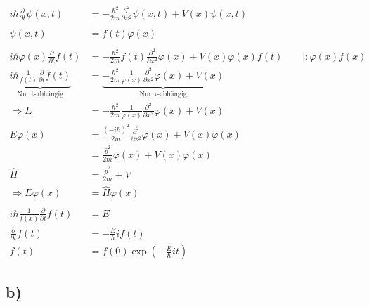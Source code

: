     \begin{align*}
        i\hbar \frac{\partial}{\partial t} \psi(x, t) &= -\frac{\hbar^2}{2m} \frac{\partial^2}{\partial x^2} \psi(x, t) + V(x) \psi(x, t)\\
        \\
        \psi(x, t) &= f(t)\varphi(x)\\
        \\
        i\hbar \varphi(x) \frac{\partial}{\partial t} f(t) &= -\frac{\hbar^2}{2m} f(t) \frac{\partial^2}{\partial x^2} \varphi(x) + V(x) \varphi(x) f(t) \qquad \vert :\varphi(x)f(x)\\
        \underbrace{i\hbar \frac{1}{f(t)} \frac{\partial}{\partial t}f(t)}_{\text{Nur t-abh\"angig}} &= \underbrace{-\frac{\hbar^2}{2m} \frac{1}{\varphi(x)} \frac{\partial^2}{\partial x^2} \varphi(x) + V(x)}_{\text{Nur x-abh\"angig}}\\
        \Rightarrow E &= -\frac{\hbar^2}{2m} \frac{1}{\varphi(x)} \frac{\partial^2}{\partial x^2} \varphi(x) + V(x)\\
        E \varphi(x) &= \frac{(-i\hbar)^2}{2m} \frac{\partial^2}{\partial x^2} \varphi(x) + V(x) \varphi(x)\\
        &= \frac{\hat{p}^2}{2m} \varphi(x) + V(x) \varphi(x)\\
        \hat{H} &= \frac{\hat{p}^2}{2m} + V\\
        \Rightarrow E \varphi(x) &= \hat{H} \varphi(x)\\
        \\
        i\hbar \frac{1}{f(x)} \frac{\partial}{\partial t} f(t) &= E\\
        \frac{\partial}{\partial t} f(t) &= -\frac{E}{\hbar} i f(t)\\
        f(t) &= f(0) \exp \left( -\frac{E}{\hbar} it \right)
    \end{align*}

\newpage
\subsection{b)}

